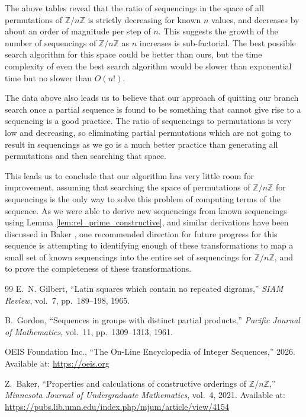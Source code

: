 \documentclass[12pt]{article}
\theoremstyle{plain}
\theoremstyle{definition}
\theoremstyle{remark}
\newcommand{\ZZ}{\mathbb{Z}}
\begin{document}
The above tables reveal that the ratio of sequencings in the space of all permutations of $\ZZ/n\ZZ$ is strictly decreasing for known $n$ values, and decreases by about an order of magnitude per step of $n$. This suggests the growth of the number of sequencings of $\ZZ/n\ZZ$ as $n$ increases is sub-factorial. The best possible search algorithm for this space could be better than ours, but the time complexity of even the best search algorithm would be slower than exponential time but no slower than $O(n!)$.

The data above also leads us to believe that our approach of quitting our branch search once a partial sequence is found to be something that cannot give rise to a sequencing is a good practice. The ratio of sequencings to permutations is very low and decreasing, so eliminating partial permutations which are not going to result in sequencings as we go is a much better practice than generating all permutations and then searching that space.

This leads us to conclude that our algorithm has very little room for improvement, assuming that searching the space of permutations of $\ZZ/n\ZZ$ for sequencings is the only way to solve this problem of computing terms of the sequence. As we were able to derive new sequencings from known sequencings using Lemma \ref{lem:rel_prime_constructive}, and similar derivations have been discussed in Baker \cite{Baker}, one recommended direction for future progress for this sequence is attempting to identifying enough of these transformations to map a small set of known sequencings into the entire set of sequencings for $\ZZ/n\ZZ$, and to prove the completeness of these transformations.

\begin{thebibliography}{99}
E.~N. Gilbert,
``Latin squares which contain no repeated digrams,''
\emph{SIAM Review},
vol.~7,
pp.~189--198,
1965.

B.~Gordon,
``Sequences in groups with distinct partial products,''
\emph{Pacific Journal of Mathematics},
vol.~11,
pp.~1309--1313,
1961.

OEIS Foundation Inc.,
``The On-Line Encyclopedia of Integer Sequences,''
2026.
Available at: \url{https://oeis.org}

Z.~Baker,
``Properties and calculations of constructive orderings of $\mathbb{Z}/n\mathbb{Z}$,''
\emph{Minnesota Journal of Undergraduate Mathematics},
vol.~4,
2021.
Available at:
\url{https://pubs.lib.umn.edu/index.php/mjum/article/view/4154}

\end{thebibliography}
\end{document}

